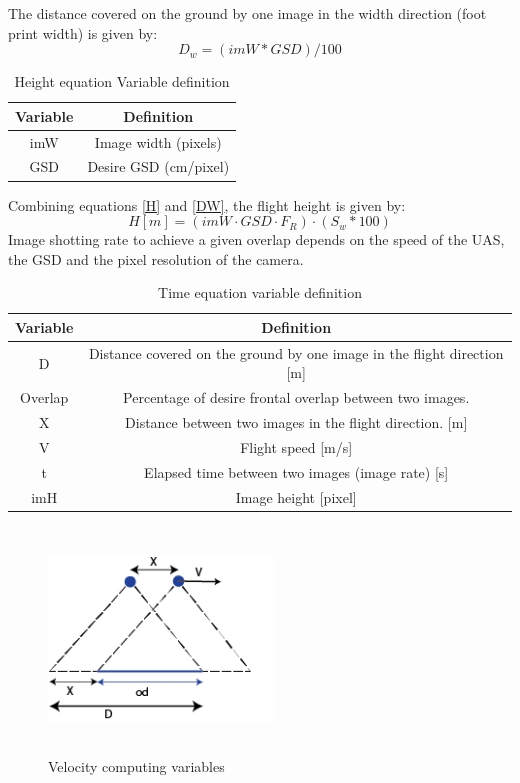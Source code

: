 The distance covered on the ground by one image in the width direction (foot print width) is given by:
\begin{equation}
D_{w}=(imW*GSD)/100
\label{DW}
\end{equation}
\begin{table}[H]
\centering
\begin{tabular}{|c|c|}
\hline
\textbf{Variable} & \textbf{Definition}   \\ \hline
imW              & Image width (pixels)  \\ \hline
GSD               & Desire GSD (cm/pixel) \\ \hline
\end{tabular}
\caption{Height equation Variable definition}
\end{table}
Combining equations \ref{H} and \ref{DW}, the flight height is given by:
\begin{equation}
H[m]=(imW\cdot GSD \cdot F_{R})\cdot (S_{w}*100)
\end{equation}
Image shotting rate to achieve a given overlap depends on the speed of the UAS, the GSD and the pixel resolution of the camera.
\begin{table}[H]
\centering
\begin{tabular}{|c|c|}
\hline
Variable & Definition                                                                  \\ \hline
D        & Distance covered on the ground by one image in the flight direction {[}m{]} \\ \hline
Overlap  & Percentage of desire frontal overlap between two images.                    \\ \hline
X        & Distance between two images in the flight direction. {[}m{]}                \\ \hline
V        & Flight speed {[}m/s{]}                                                      \\ \hline
t        & Elapsed time between two images (image rate) {[}s{]}                        \\ \hline
imH      & Image height {[}pixel{]}                                                    \\ \hline
\end{tabular}
\caption{Time equation variable definition}
\end{table}
\begin{figure}[H]
\centering
\includegraphics[width=6cm,height=6cm,keepaspectratio]{imagenes/Velocity.png}
\caption{Velocity computing variables}
\label{fig:velocity}
\end{figure}
